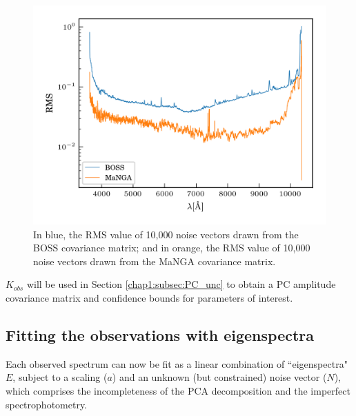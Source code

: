 \begin{figure}
    \centering
    \includegraphics[width=\columnwidth]{boss_manga_cov}
    \caption[Sample noise spectra drawn from MaNGA and BOSS spectrophotometric covariance]{\fixspacing In blue, the RMS value of 10,000 noise vectors drawn from the BOSS covariance matrix; and in orange, the RMS value of 10,000 noise vectors drawn from the MaNGA covariance matrix.}
    \label{fig:boss_manga_cov}
\end{figure}

$K_{obs}$ will be used in Section \ref{chap1:subsec:PC_unc} to obtain a PC amplitude covariance matrix and confidence bounds for parameters of interest.

\subsection{Fitting the observations with eigenspectra}
\label{chap1:sec:obs2pc}

Each observed spectrum can now be fit as a linear combination of ``eigenspectra" $E$, subject to a scaling ($a$) and an unknown (but constrained) noise vector ($N$), which comprises the incompleteness of the PCA decomposition and the imperfect spectrophotometry.

